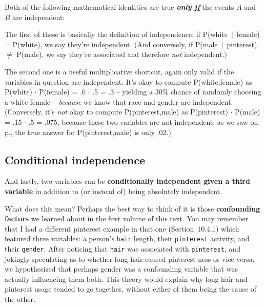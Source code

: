 Both of the following mathematical identities are true \textit{\textbf{only
\underline{if}}} the events $A$ and $B$ are independent:

\smallskip
{}
\bigskip

The first of these is basically the definition of independence: if P(white\
$|$\ female) = P(white), we say they're independent. (And conversely, if
P(male\ $|$\ pinterest) $\neq$ P(male), we say they're associated and therefore
\textit{not} independent.)

The second one is a useful multiplicative shortcut, again only valid if the
variables in question are independent. It's okay to compute P(white,female) as
P(white) $\cdot$ P(female) = .6 $\cdot$ .5 = .3 -- yielding a 30\% chance of
randomly choosing a white female -- \textit{because} we know that race and
gender are independent. (Conversely, it's \textit{not} okay to compute
P(pinterest,male) as P(pinterest) $\cdot$ P(male) = .15 $\cdot$ .5 = .075,
because these two variables are not independent; as we saw on
p.\pageref{calculateMarginalConditional}, the true answer for P(pinterest,male)
is only .02.)

\subsection{Conditional independence}


And lastly, two variables can be \textbf{conditionally independent given a
third variable} in addition to (or instead of) being absolutely independent.


What does this mean? Perhaps the best way to think of it is those
\textbf{confounding factors} we learned about in the first volume of this text.
You may remember that I had a different pinterest example in that one
(Section~10.4.1) which featured three variables: a person's \texttt{hair}
length, their \texttt{pinterest} activity, and their \texttt{gender}. After
noticing that \texttt{hair} was associated with \texttt{pinterest}, and
jokingly speculating as to whether long-hair caused pinterest-ness or vice
versa, we hypothesized that perhaps gender was a confounding variable that was
actually influencing them both. This theory would explain why long hair and
pinterest usage tended to go together, without either of them being the cause
of the other.

